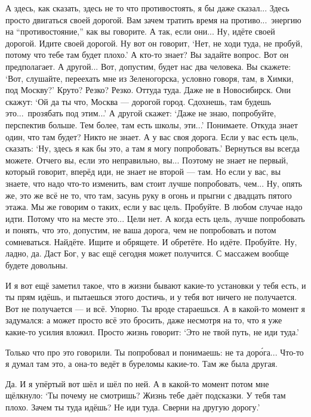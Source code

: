 \A
А здесь, как сказать, здесь не то что противостоять, я бы даже сказал...
Здесь просто двигаться своей дорогой.
Вам зачем тратить время на противо...\ энергию на ``противостояние,'' как вы говорите.
А так, если они... Ну, идёте своей дорогой. Идите своей дорогой.
Ну вот он говорит, `Нет, не ходи туда, не пробуй, потому что тебе там будет плохо.'
А кто-то знает?
Вы задайте вопрос. Вот он предполагает. А другой... Вот, допустим, будет нас два человека.
Вы скажете: `Вот, слушайте, переехать мне из Зеленогорска, условно говоря, там, в Химки,
под Москву?' Круто? Резко? Резко. Оттуда туда. Даже не в Новосибирск.
Они скажут: `Ой да ты что, Москва --- дорогой город. Сдохнешь, там будешь это...\
прозябать под этим...'
А другой скажет: `Даже не знаю, попробуйте, перспектив больше. Тем более, там есть школы, эти...'
Понимаете.
Откуда знает один, что там будет? Никто не знает. А у вас своя дорога.
Если у вас есть цель, сказать: `Ну, здесь я как бы это, а там я могу попробовать.'
Вернуться вы всегда можете.
Отчего вы, если это неправильно, вы...
Поэтому не знает не первый, который говорит, вперёд иди, не знает не второй --- там.
Но если у вас, вы знаете, что надо что-то изменить, вам стоит лучше попробовать, чем...
Ну, опять же, это же всё не то, что там, засунь руку в огонь и прыгни с двадцать пятого этажа.
Мы же говорим о таких, если у вас цель.
Пробуйте.
В любом случае надо идти.
Потому что на месте это...
Цели нет.
А когда есть цель, лучше попробовать и понять, что это, допустим, не ваша дорога, чем не
попробовать и потом сомневаться.
Найдёте.
Ищите и обрящете.
И обретёте.
Но идёте.
Пробуйте.
Ну, ладно, да.
Даст Бог, у вас ещё сегодня может получится.
С массажем вообще будете довольны.

\I
И я вот ещё заметил такое, что в жизни бывают какие-то установки у тебя есть, и ты прям идёшь,
и пытаешься этого достичь, и у тебя вот ничего не получается.
Вот не получается --- и всё. Упорно.
Ты вроде стараешься.
А в какой-то момент я задумался:
а может просто всё это бросить, даже несмотря на то, что я уже какие-то усилия вложил.
Просто жизнь говорит:
`Это не твой путь, не иди туда.'

\A
Только что про это говорили.
Ты попробовал и понимаешь: не та дор\'ога...
Что-то я думал там это, а она-то ведёт в буреломы какие-то.
Там же была другая.

\I
Да. И я упёртый вот шёл и шёл по ней.
А в какой-то момент потом мне щёлкнуло:
`Ты почему не смотришь?
Жизнь тебе даёт подсказки.
У тебя там плохо.
Зачем ты туда идёшь?
Не иди туда.
Сверни на другую дорогу.'

